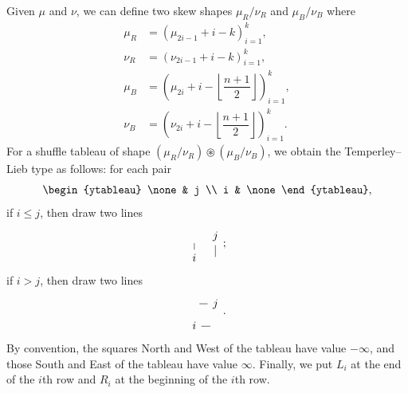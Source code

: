 \documentclass[ALCO,Unicode]{cedram}
\begin{document}
    Given $\mu$ and $\nu$, we can define two skew shapes $\mu_R/\nu_R$ and $\mu_B/\nu_B$ where
    \begin{align*}
    \mu_R &= (\mu_{2i-1}+i-k)_{i = 1}^k, \\
    \nu_R &= (\nu_{2i-1}+i-k)_{i = 1}^k, \\
    \mu_B &= \left(\mu_{2i}+i-\left\lfloor\dfrac{n+1}{2}\right\rfloor\right)_{i = 1}^k, \\
    \nu_B &= \left(\nu_{2i}+i-\left\lfloor\dfrac{n+1}{2}\right\rfloor\right)_{i = 1}^k.
    \end{align*}
    For a shuffle tableau of shape $(\mu_R/\nu_R)\circledast(\mu_B/\nu_B)$, we obtain the Temperley--Lieb type as follows: for each pair
    \[ \begin{ytableau} 
    \none & j \\ 
    i & \none
    \end{ytableau}, \]
    if $i \leq j$, then draw two lines
    \[ \begin{tikzcd}[sep = tiny]
	{} & j \\
	i & {}
	\arrow[no head, from=2-1, to=1-1]
	\arrow[no head, from=1-2, to=2-2]
    \end{tikzcd}; \]
    if $i > j$, then draw two lines
    \[ \begin{tikzcd}[sep = tiny]
	{} & j \\
	i & {}
	\arrow[no head, from=2-1, to=2-2]
	\arrow[no head, from=1-2, to=1-1]
    \end{tikzcd}. \]
    By convention, the squares North and West of the tableau have value $-\infty$, and those South and East of the tableau have value $\infty$. Finally, we put $L_i$ at the end of the $i$th row and $R_i$ at the beginning of the $i$th row.
\end{document}
